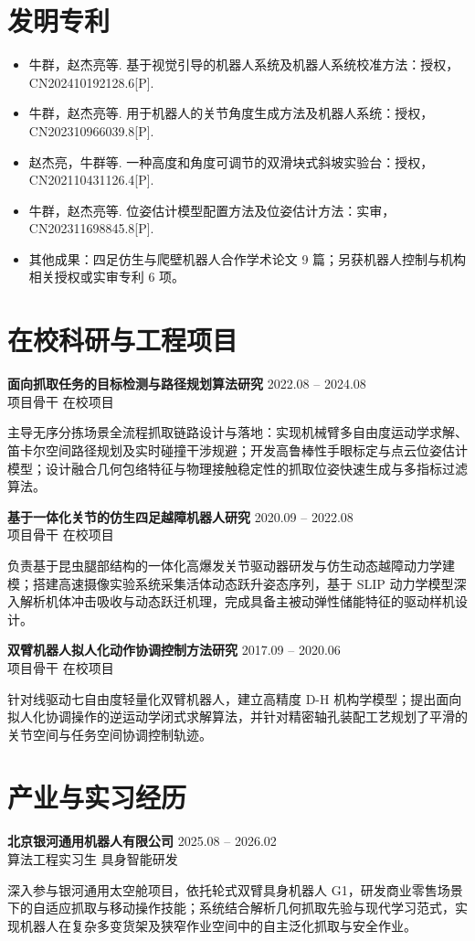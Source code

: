\documentclass[10.5pt,a4paper]{article}
\newcommand{\entry}[4]{%
  \noindent\textbf{#1} \hfill #2\\
  {\color{subtextgray}#3} \hfill {#4}\par\vspace{1.5pt}
}
\begin{document}
\section*{发明专利}
\begin{itemize}
	\item 牛群，赵杰亮等. 基于视觉引导的机器人系统及机器人系统校准方法：授权，CN202410192128.6[P].
	\item 牛群，赵杰亮等. 用于机器人的关节角度生成方法及机器人系统：授权，CN202310966039.8[P].
	\item 赵杰亮，牛群等. 一种高度和角度可调节的双滑块式斜坡实验台：授权，CN202110431126.4[P].
	\item 牛群，赵杰亮等. 位姿估计模型配置方法及位姿估计方法：实审，CN202311698845.8[P].
	\item 其他成果：四足仿生与爬壁机器人合作学术论文 9 篇；另获机器人控制与机构相关授权或实审专利 6 项。
\end{itemize}

\newpage

\section*{在校科研与工程项目}
\entry{面向抓取任务的目标检测与路径规划算法研究}{2022.08 -- 2024.08}{项目骨干}{在校项目}
主导无序分拣场景全流程抓取链路设计与落地：实现机械臂多自由度运动学求解、笛卡尔空间路径规划及实时碰撞干涉规避；开发高鲁棒性手眼标定与点云位姿估计模型；设计融合几何包络特征与物理接触稳定性的抓取位姿快速生成与多指标过滤算法。

\entry{基于一体化关节的仿生四足越障机器人研究}{2020.09 -- 2022.08}{项目骨干}{在校项目}
负责基于昆虫腿部结构的一体化高爆发关节驱动器研发与仿生动态越障动力学建模；搭建高速摄像实验系统采集活体动态跃升姿态序列，基于 SLIP 动力学模型深入解析机体冲击吸收与动态跃迁机理，完成具备主被动弹性储能特征的驱动样机设计。

\entry{双臂机器人拟人化动作协调控制方法研究}{2017.09 -- 2020.06}{项目骨干}{在校项目}
针对线驱动七自由度轻量化双臂机器人，建立高精度 D-H 机构学模型；提出面向拟人化协调操作的逆运动学闭式求解算法，并针对精密轴孔装配工艺规划了平滑的关节空间与任务空间协调控制轨迹。

\section*{产业与实习经历}
\entry{北京银河通用机器人有限公司}{2025.08 -- 2026.02}{算法工程实习生}{具身智能研发}
深入参与银河通用太空舱项目，依托轮式双臂具身机器人 G1，研发商业零售场景下的自适应抓取与移动操作技能；系统结合解析几何抓取先验与现代学习范式，实现机器人在复杂多变货架及狭窄作业空间中的自主泛化抓取与安全作业。
\end{document}
